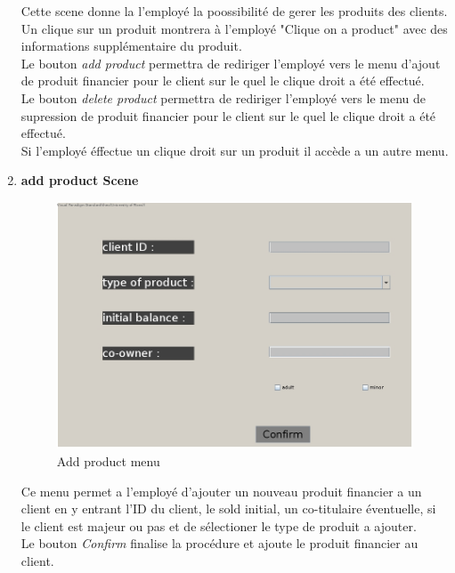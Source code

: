 \documentclass[../rapport.tex]{subfiles}
\begin{document}
\begin{enumerate}
Cette scene donne la l'employé la poossibilité de gerer les produits des clients.\\
Un clique sur un produit montrera à l'employé "Clique on a product" avec des informations supplémentaire du produit.\\
Le bouton \textit{add product} permettra de rediriger l'employé vers le menu d'ajout de produit financier pour le client sur le quel le clique droit a été effectué.\\
Le bouton \textit{delete product} permettra de rediriger l'employé vers le menu de supression de produit financier pour le client sur le quel le clique droit a été effectué.\\
Si l'employé éffectue un clique droit sur un produit il accède a un autre menu.\\
\newpage
\item \textbf{add product Scene} \\
		\begin{figure}[h!]
				\centering \includegraphics[scale=0.2]{ressources/photos_diagrammes/app2/gui/addFinancialProductMenu.jpg}
				\caption{Add product menu}
		\end{figure}
Ce menu permet a l'employé d'ajouter un nouveau produit financier a un client en y entrant l'ID du client, le sold initial, un co-titulaire éventuelle, si le client est majeur ou pas et de sélectioner le type de produit a ajouter.\\
Le bouton \textit{Confirm} finalise la procédure et ajoute le produit financier au client.\\

\newpage


\end{enumerate}
\end{document}
